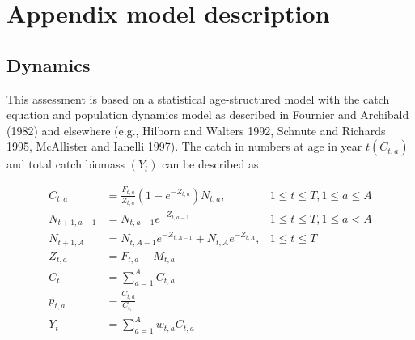 \documentclass[11pt,
  english,
  a4paper,
]{article}
\begin{document}
\tagmcend\tagstructend


\hypertarget{appendix-model-description}{%
\section{Appendix model description}\label{appendix-model-description}}

\leavevmode\tagmcend\tagstructend


\hypertarget{dynamics}{%
\subsection{Dynamics}\label{dynamics}}

\leavevmode\tagmcend\tagstructend


This assessment is based on a statistical age-structured model with the catch equation and population dynamics model as described in Fournier and Archibald (1982) and elsewhere (e.g., Hilborn and Walters 1992, Schnute and Richards 1995, McAllister and Ianelli 1997). The catch in numbers at age in year {\(t (C_{t,a})\)\leavevmode\tagmcend\tagstructend} and total catch biomass {\((Y_t)\)\leavevmode\tagmcend\tagstructend} can be described as:

\leavevmode\tagmcend\tagstructend\par


\begin{align}
    C_{t,a}     &= \frac{F_{t,a}}{Z_{t,a}} \left(1 - e^{-Z_{t,a}}\right) N_{t,a}, &1 \le t \le T, 1 \le a \le A \\
    N_{t+1,a+1} &= N_{t,a-1} e^{-Z_{t,a-1}}                                       &1 \le t \le T, 1 \le a < A   \\
    N_{t+1,A}   &= N_{t,A-1} e^{-Z_{t,A-1}} + N_{t,A} e^{-Z_{t,A}} ,              &1 \le t \le T                \\
    Z_{t,a}     &= F_{t,a} + M_{t,a}                                                                            \\
    C_{t,.}     &= \sum_{a=1}^A{C_{t,a}}                                                                        \\
    p_{t,a}     &= \frac{C_{t,a} } {C_{t,.} }                                                                   \\
    Y_{t}       &= \sum_{a=1}^A{w_{t,a}C_{t,a}}                                                                 \\
\end{align}
\end{document}

